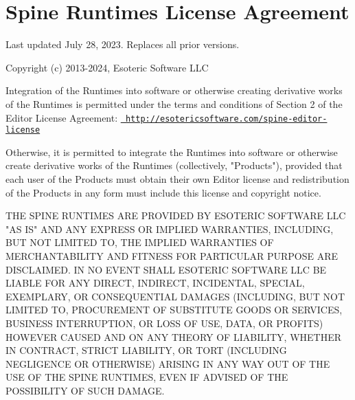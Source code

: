 \chapter{Spine Runtimes License Agreement}
\hypertarget{md_external_2spine-runtimes_2spine-unity_2_modules_2com_8esotericsoftware_8spine_8ui-toolkit_2_l_i_c_e_n_s_e}{}\label{md_external_2spine-runtimes_2spine-unity_2_modules_2com_8esotericsoftware_8spine_8ui-toolkit_2_l_i_c_e_n_s_e}
\label{md_external_2spine-runtimes_2spine-unity_2_modules_2com_8esotericsoftware_8spine_8ui-toolkit_2_l_i_c_e_n_s_e_autotoc_md1143}%
%


Last updated July 28, 2023. Replaces all prior versions.

Copyright (c) 2013-\/2024, Esoteric Software LLC

Integration of the  Runtimes into software or otherwise creating derivative works of the  Runtimes is permitted under the terms and conditions of Section 2 of the  Editor License Agreement\+: \href{http://esotericsoftware.com/spine-editor-license}{\texttt{ http\+://esotericsoftware.\+com/spine-\/editor-\/license}}

Otherwise, it is permitted to integrate the  Runtimes into software or otherwise create derivative works of the  Runtimes (collectively, "{}\+Products"{}), provided that each user of the Products must obtain their own  Editor license and redistribution of the Products in any form must include this license and copyright notice.

THE SPINE RUNTIMES ARE PROVIDED BY ESOTERIC SOFTWARE LLC "{}\+AS IS"{} AND ANY EXPRESS OR IMPLIED WARRANTIES, INCLUDING, BUT NOT LIMITED TO, THE IMPLIED WARRANTIES OF MERCHANTABILITY AND FITNESS FOR  PARTICULAR PURPOSE ARE DISCLAIMED. IN NO EVENT SHALL ESOTERIC SOFTWARE LLC BE LIABLE FOR ANY DIRECT, INDIRECT, INCIDENTAL, SPECIAL, EXEMPLARY, OR CONSEQUENTIAL DAMAGES (INCLUDING, BUT NOT LIMITED TO, PROCUREMENT OF SUBSTITUTE GOODS OR SERVICES, BUSINESS INTERRUPTION, OR LOSS OF USE, DATA, OR PROFITS) HOWEVER CAUSED AND ON ANY THEORY OF LIABILITY, WHETHER IN CONTRACT, STRICT LIABILITY, OR TORT (INCLUDING NEGLIGENCE OR OTHERWISE) ARISING IN ANY WAY OUT OF THE USE OF THE SPINE RUNTIMES, EVEN IF ADVISED OF THE POSSIBILITY OF SUCH DAMAGE. 